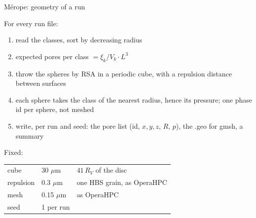 \documentclass[10pt,aspectratio=169]{beamer}
\begin{document}
\begin{frame}{M\'erope: geometry of a run}

For every run file:
\begin{enumerate}
\item read the classes, sort by decreasing radius
\item expected pores per class $=\xi_k/V_k\cdot L^3$
\item throw the spheres by RSA in a periodic cube, with a repulsion distance between surfaces
\item each sphere takes the class of the nearest radius, hence its pressure; one phase id per sphere, not meshed
\item write, per run and seed: the pore list (id, $x,y,z$, $R$, $p$), the .geo for gmsh, a summary
\end{enumerate}
Fixed:\\[4pt]
\begin{tabular}{@{}lll@{}}
\toprule
cube & 30 $\mu$m & $41\,R_V$ of the disc\\
repulsion & 0.3 $\mu$m & one HBS grain, as OperaHPC \\
mesh & 0.15 $\mu$m & as OperaHPC \\
seed & 1 per run & \\
\bottomrule
\end{tabular}
\end{frame}
\end{document}
